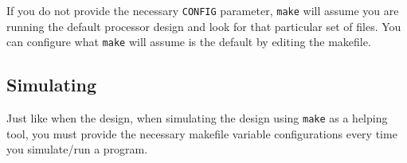 \begin{blackbox}
  If you do not provide the necessary \texttt{CONFIG} parameter, \texttt{make} will assume you are running the default processor design and look for that particular set of files.
  You can configure what \texttt{make} will assume is the default by editing the  makefile.
\end{blackbox}

\subsection{Simulating}\label{sec:Custom_Config-Simulating}
Just like when  the design, when simulating the design using \texttt{make} as a helping tool, you must provide the necessary makefile variable configurations every time you simulate/run a program.

